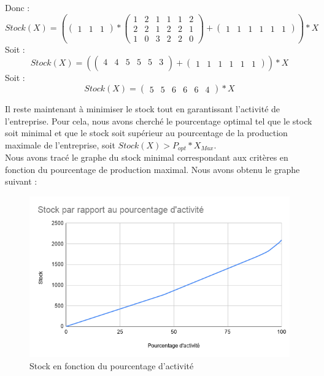 \documentclass{article}
\begin{document}
Donc :
\[ 
   Stock(X) =  
   (
   \begin{pmatrix} 
   1 & 1 & 1 
   \end{pmatrix}
   *
   \begin{pmatrix} 
   1 & 2 & 1 & 1 & 1 & 2 \\ 
   2 & 2 & 1 & 2 & 2 & 1 \\
   1 & 0 & 3 & 2 & 2 & 0
   \end{pmatrix} 
   +
   \begin{pmatrix} 
   1 & 1 & 1 & 1 & 1 & 1
   \end{pmatrix} 
   )*X
\]
Soit :
\[ 
   Stock(X) =  
   (
   \begin{pmatrix} 
   4 & 4 & 5 & 5 & 5 & 3 \\
   \end{pmatrix}
   +
   \begin{pmatrix} 
   1 & 1 & 1 & 1 & 1 & 1
   \end{pmatrix} 
   )*X
\]
Soit :
\[ 
   Stock(X) =  
   \begin{pmatrix} 
   5 & 5 & 6 & 6 & 6 & 4
   \end{pmatrix}
	*X
\]

Il reste maintenant à minimiser le stock tout en garantissant l'activité de l'entreprise. Pour cela, nous avons cherché le pourcentage optimal tel que le stock soit minimal et que le stock soit supérieur au pourcentage de la  production maximale de l'entreprise, soit $Stock(X)> P_{opt}*X_{Max}$.\\
Nous avons tracé le graphe du stock minimal correspondant aux critères en fonction du pourcentage de production maximal. Nous avons obtenu le graphe suivant : 

\begin{center}
\begin{figure}[H]
\includegraphics[width=1\textwidth]{img/Stock_Activite}
\caption{Stock en fonction du pourcentage d'activité}
\end{figure}
\end{center}
\end{document}
